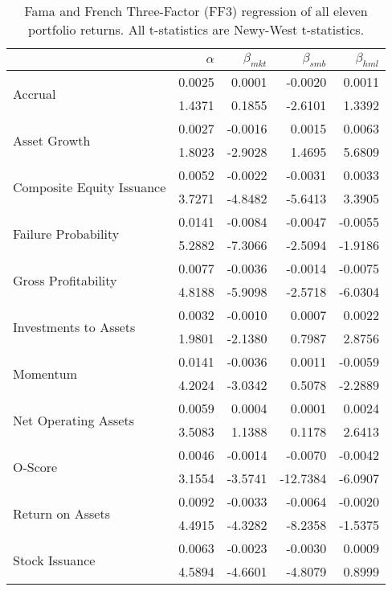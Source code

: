 \documentclass[a4paper]{article}                 %
\begin{document}
\begin{table}[h]
    \scriptsize
    \caption{\newline Fama and French Three-Factor (FF3) regression of all eleven portfolio returns. All t-statistics are Newy-West t-statistics.}
    \label{tab:Table 3}
    \begin{tabular}{@{}lrrrr@{}}
    \toprule
     & $\alpha$ & $\beta_{mkt}$ & $\beta_{smb}$ & $\beta_{hml}$ \\ \midrule
    \multirow{2}{*}{Accrual} & 0.0025 & 0.0001 & -0.0020 & 0.0011 \\
     & 1.4371 & 0.1855 & -2.6101 & 1.3392 \\
    \multirow{2}{*}{Asset Growth} & 0.0027 & -0.0016 & 0.0015 & 0.0063 \\
     & 1.8023 & -2.9028 & 1.4695 & 5.6809 \\
    \multirow{2}{*}{Composite Equity Issuance} & 0.0052 & -0.0022 & -0.0031 & 0.0033 \\
     & 3.7271 & -4.8482 & -5.6413 & 3.3905 \\
    \multirow{2}{*}{Failure Probability} & 0.0141 & -0.0084 & -0.0047 & -0.0055 \\
     & 5.2882 & -7.3066 & -2.5094 & -1.9186 \\
    \multirow{2}{*}{Gross Profitability} & 0.0077 & -0.0036 & -0.0014 & -0.0075 \\
     & 4.8188 & -5.9098 & -2.5718 & -6.0304 \\
    \multirow{2}{*}{Investments to Assets} & 0.0032 & -0.0010 & 0.0007 & 0.0022 \\
     & 1.9801 & -2.1380 & 0.7987 & 2.8756 \\
    \multirow{2}{*}{Momentum} & 0.0141 & -0.0036 & 0.0011 & -0.0059 \\
     & 4.2024 & -3.0342 & 0.5078 & -2.2889 \\
    \multirow{2}{*}{Net Operating Assets} & 0.0059 & 0.0004 & 0.0001 & 0.0024 \\
     & 3.5083 & 1.1388 & 0.1178 & 2.6413 \\
    \multirow{2}{*}{O-Score} & 0.0046 & -0.0014 & -0.0070 & -0.0042 \\
     & 3.1554 & -3.5741 & -12.7384 & -6.0907 \\
    \multirow{2}{*}{Return on Assets} & 0.0092 & -0.0033 & -0.0064 & -0.0020 \\
     & 4.4915 & -4.3282 & -8.2358 & -1.5375 \\
    \multirow{2}{*}{Stock Issuance} & 0.0063 & -0.0023 & -0.0030 & 0.0009 \\
     & 4.5894 & -4.6601 & -4.8079 & 0.8999 \\ \bottomrule
    \end{tabular}
\end{table}
\end{document}
